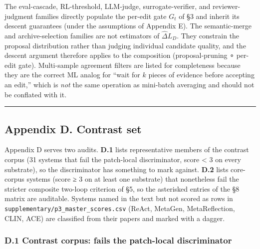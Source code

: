 \documentclass[
]{article}
\newcounter{none} %
\begin{document}
The eval-cascade, RL-threshold, LLM-judge, surrogate-verifier, and
reviewer-judgment families directly populate the per-edit gate \(G_t\)
of §3 and inherit its descent guarantees (under the assumptions of
Appendix E). The semantic-merge and archive-selection families are not
estimators of \(\widehat{\Delta} L_D\). They constrain the proposal
distribution rather than judging individual candidate quality, and the
descent argument therefore applies to the composition (proposal-pruning
∘ per-edit gate). Multi-sample agreement filters are listed for
completeness because they are the correct ML analog for ``wait for \(k\)
pieces of evidence before accepting an edit,'' which is \emph{not} the
same operation as mini-batch averaging and should not be conflated with
it.

\begin{center}\rule{0.5\linewidth}{0.5pt}\end{center}

\subsection{Appendix D. Contrast set}\label{appendix-d.-contrast-set}

Appendix D serves two audits. \textbf{D.1} lists representative members
of the contrast corpus (31 systems that fail the patch-local
discriminator, score \textless{} 3 on every substrate), so the
discriminator has something to mark against. \textbf{D.2} lists
core-corpus systems (score ≥ 3 on at least one substrate) that
nonetheless fail the stricter composite two-loop criterion of §5, so the
asterisked entries of the §8 matrix are auditable. Systems named in the
text but not scored as rows in
\texttt{supplementary/p3\_master\_scores.csv} (ReAct, MetaGen,
MetaReflection, CLIN, ACE) are classified from their papers and marked
with a dagger.

\subsubsection{D.1 Contrast corpus: fails the patch-local
discriminator}\label{d.1-contrast-corpus-fails-the-patch-local-discriminator}
\end{document}
